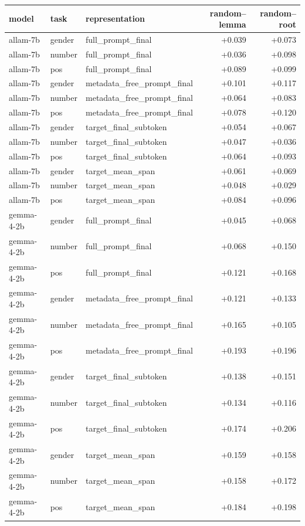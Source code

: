 \begin{tabular}{lllrr}
model & task & representation & random--lemma & random--root \\
\hline
allam-7b & gender & full_prompt_final & +0.039 & +0.073 \\
allam-7b & number & full_prompt_final & +0.036 & +0.098 \\
allam-7b & pos & full_prompt_final & +0.089 & +0.099 \\
allam-7b & gender & metadata_free_prompt_final & +0.101 & +0.117 \\
allam-7b & number & metadata_free_prompt_final & +0.064 & +0.083 \\
allam-7b & pos & metadata_free_prompt_final & +0.078 & +0.120 \\
allam-7b & gender & target_final_subtoken & +0.054 & +0.067 \\
allam-7b & number & target_final_subtoken & +0.047 & +0.036 \\
allam-7b & pos & target_final_subtoken & +0.064 & +0.093 \\
allam-7b & gender & target_mean_span & +0.061 & +0.069 \\
allam-7b & number & target_mean_span & +0.048 & +0.029 \\
allam-7b & pos & target_mean_span & +0.084 & +0.096 \\
gemma-4-2b & gender & full_prompt_final & +0.045 & +0.068 \\
gemma-4-2b & number & full_prompt_final & +0.068 & +0.150 \\
gemma-4-2b & pos & full_prompt_final & +0.121 & +0.168 \\
gemma-4-2b & gender & metadata_free_prompt_final & +0.121 & +0.133 \\
gemma-4-2b & number & metadata_free_prompt_final & +0.165 & +0.105 \\
gemma-4-2b & pos & metadata_free_prompt_final & +0.193 & +0.196 \\
gemma-4-2b & gender & target_final_subtoken & +0.138 & +0.151 \\
gemma-4-2b & number & target_final_subtoken & +0.134 & +0.116 \\
gemma-4-2b & pos & target_final_subtoken & +0.174 & +0.206 \\
gemma-4-2b & gender & target_mean_span & +0.159 & +0.158 \\
gemma-4-2b & number & target_mean_span & +0.158 & +0.172 \\
gemma-4-2b & pos & target_mean_span & +0.184 & +0.198 \\

\end{tabular}
